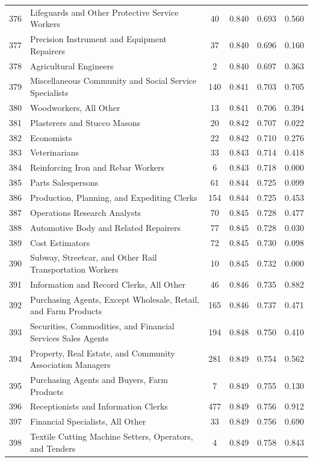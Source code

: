 {\begin{longtable}{llcccc}
 376 & Lifeguards and Other Protective Service Workers & 40 & 0.840 & 0.693 & 0.560 \\
 377 & Precision Instrument and Equipment Repairers & 37 & 0.840 & 0.696 & 0.160 \\
 378 & Agricultural Engineers & 2 & 0.840 & 0.697 & 0.363 \\
 379 & Miscellaneous Community and Social Service Specialists & 140 & 0.841 & 0.703 & 0.705 \\
 380 & Woodworkers, All Other & 13 & 0.841 & 0.706 & 0.394 \\
 381 & Plasterers and Stucco Masons & 20 & 0.842 & 0.707 & 0.022 \\
 382 & Economists & 22 & 0.842 & 0.710 & 0.276 \\
 383 & Veterinarians & 33 & 0.843 & 0.714 & 0.418 \\
 384 & Reinforcing Iron and Rebar Workers & 6 & 0.843 & 0.718 & 0.000 \\
 385 & Parts Salespersons & 61 & 0.844 & 0.725 & 0.099 \\
 386 & Production, Planning, and Expediting Clerks & 154 & 0.844 & 0.725 & 0.453 \\
 387 & Operations Research Analysts & 70 & 0.845 & 0.728 & 0.477 \\
 388 & Automotive Body and Related Repairers & 77 & 0.845 & 0.728 & 0.030 \\
 389 & Cost Estimators & 72 & 0.845 & 0.730 & 0.098 \\
 390 & Subway, Streetcar, and Other  Rail Transportation Workers & 10 & 0.845 & 0.732 & 0.000 \\
 391 & Information and Record Clerks, All Other & 46 & 0.846 & 0.735 & 0.882 \\
 392 & Purchasing Agents, Except Wholesale, Retail, and Farm Products & 165 & 0.846 & 0.737 & 0.471 \\
 393 & Securities, Commodities, and Financial Services Sales Agents & 194 & 0.848 & 0.750 & 0.410 \\
 394 & Property, Real Estate, and Community Association Managers & 281 & 0.849 & 0.754 & 0.562 \\
 395 & Purchasing Agents and Buyers, Farm Products & 7 & 0.849 & 0.755 & 0.130 \\
 396 & Receptionists and Information Clerks & 477 & 0.849 & 0.756 & 0.912 \\
 397 & Financial Specialists, All Other & 33 & 0.849 & 0.756 & 0.690 \\
 398 & Textile Cutting Machine Setters, Operators, and Tenders & 4 & 0.849 & 0.758 & 0.843 \\

\end{longtable}}
